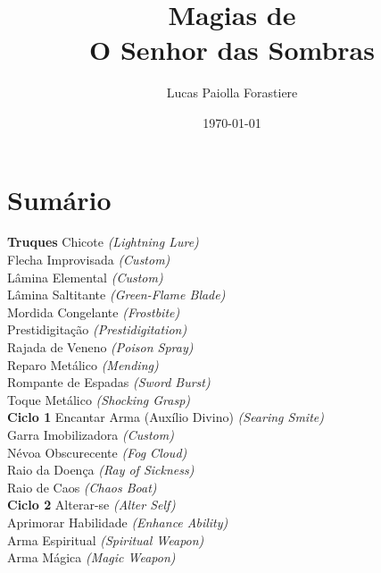 \documentclass{RPG_Adventure}[2021/10/20]
\title{Magias de\\ \Huge{O Senhor das Sombras}}
\date{\today}
\author{Lucas Paiolla Forastiere}
\begin{document}
\maketitle

\chapter{Sumário}\n\n\noindent\textbf{Truques}
{\normalsize Chicote \textit{(Lightning Lure)}\\ }
{\normalsize Flecha Improvisada \textit{(Custom)}\\ }
{\normalsize Lâmina Elemental \textit{(Custom)}\\ }
{\normalsize Lâmina Saltitante \textit{(Green-Flame Blade)}\\ }
{\normalsize Mordida Congelante \textit{(Frostbite)}\\ }
{\normalsize Prestidigitação \textit{(Prestidigitation)}\\ }
{\normalsize Rajada de Veneno \textit{(Poison Spray)}\\ }
{\normalsize Reparo Metálico \textit{(Mending)}\\ }
{\normalsize Rompante de Espadas \textit{(Sword Burst)}\\ }
{\normalsize Toque Metálico \textit{(Shocking Grasp)}\\ }
\jump\noindent\textbf{Ciclo 1}
{\normalsize Encantar Arma (Auxílio Divino) \textit{(Searing Smite)}\\ }
{\normalsize Garra Imobilizadora \textit{(Custom)}\\ }
{\normalsize Névoa Obscurecente \textit{(Fog Cloud)}\\ }
{\normalsize Raio da Doença \textit{(Ray of Sickness)}\\ }
{\normalsize Raio de Caos \textit{(Chaos Boat)}\\ }
\jump\noindent\textbf{Ciclo 2}
{\normalsize Alterar-se \textit{(Alter Self)}\\ }
{\normalsize Aprimorar Habilidade \textit{(Enhance Ability)}\\ }
{\normalsize Arma Espiritual \textit{(Spiritual Weapon)}\\ }
{\normalsize Arma Mágica \textit{(Magic Weapon)}\\ }
\end{document}

